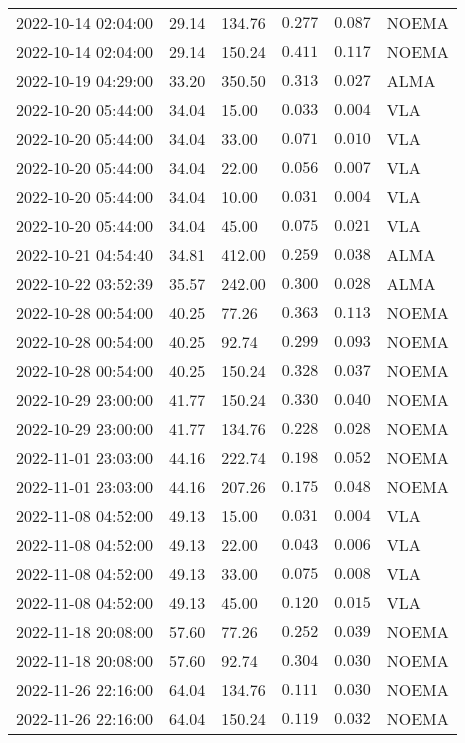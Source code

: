 \documentclass{nature_plusfigure}
\begin{document}
\begin{supplement}
\begin{center}
\begin{longtable}{llllll}
2022-10-14 02:04:00 & 29.14 & 134.76 & $0.277$ & $0.087$ & NOEMA \\ 
2022-10-14 02:04:00 & 29.14 & 150.24 & $0.411$ & $0.117$ & NOEMA \\ 
2022-10-19 04:29:00 & 33.20 & 350.50 & $0.313$ & $0.027$ & ALMA \\ 
2022-10-20 05:44:00 & 34.04 & 15.00 & $0.033$ & $0.004$ & VLA \\ 
2022-10-20 05:44:00 & 34.04 & 33.00 & $0.071$ & $0.010$ & VLA \\ 
2022-10-20 05:44:00 & 34.04 & 22.00 & $0.056$ & $0.007$ & VLA \\ 
2022-10-20 05:44:00 & 34.04 & 10.00 & $0.031$ & $0.004$ & VLA \\ 
2022-10-20 05:44:00 & 34.04 & 45.00 & $0.075$ & $0.021$ & VLA \\ 
2022-10-21 04:54:40 & 34.81 & 412.00 & $0.259$ & $0.038$ & ALMA \\ 
2022-10-22 03:52:39 & 35.57 & 242.00 & $0.300$ & $0.028$ & ALMA \\ 
2022-10-28 00:54:00 & 40.25 & 77.26 & $0.363$ & $0.113$ & NOEMA \\ 
2022-10-28 00:54:00 & 40.25 & 92.74 & $0.299$ & $0.093$ & NOEMA \\ 
2022-10-28 00:54:00 & 40.25 & 150.24 & $0.328$ & $0.037$ & NOEMA \\ 
2022-10-29 23:00:00 & 41.77 & 150.24 & $0.330$ & $0.040$ & NOEMA \\ 
2022-10-29 23:00:00 & 41.77 & 134.76 & $0.228$ & $0.028$ & NOEMA \\ 
2022-11-01 23:03:00 & 44.16 & 222.74 & $0.198$ & $0.052$ & NOEMA \\ 
2022-11-01 23:03:00 & 44.16 & 207.26 & $0.175$ & $0.048$ & NOEMA \\ 
2022-11-08 04:52:00 & 49.13 & 15.00 & $0.031$ & $0.004$ & VLA \\ 
2022-11-08 04:52:00 & 49.13 & 22.00 & $0.043$ & $0.006$ & VLA \\ 
2022-11-08 04:52:00 & 49.13 & 33.00 & $0.075$ & $0.008$ & VLA \\ 
2022-11-08 04:52:00 & 49.13 & 45.00 & $0.120$ & $0.015$ & VLA \\ 
2022-11-18 20:08:00 & 57.60 & 77.26 & $0.252$ & $0.039$ & NOEMA \\ 
2022-11-18 20:08:00 & 57.60 & 92.74 & $0.304$ & $0.030$ & NOEMA \\ 
2022-11-26 22:16:00 & 64.04 & 134.76 & $0.111$ & $0.030$ & NOEMA \\ 
2022-11-26 22:16:00 & 64.04 & 150.24 & $0.119$ & $0.032$ & NOEMA \\ 

\end{longtable}
\end{center}
\end{supplement}
\end{document}
